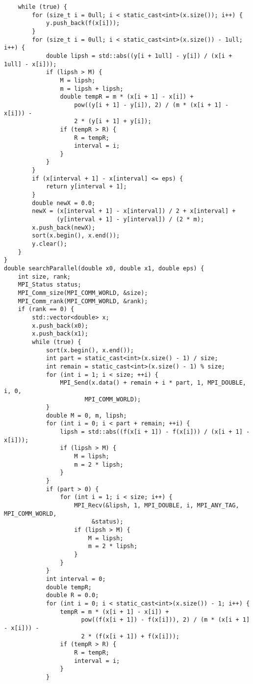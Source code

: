 \documentclass{article}
\begin{document}
\begin{lstlisting}
    while (true) {
        for (size_t i = 0ull; i < static_cast<int>(x.size()); i++) {
            y.push_back(f(x[i]));
        }
        for (size_t i = 0ull; i < static_cast<int>(x.size()) - 1ull; i++) {
            double lipsh = std::abs((y[i + 1ull] - y[i]) / (x[i + 1ull] - x[i]));
            if (lipsh > M) {
                M = lipsh;
                m = lipsh + lipsh;
                double tempR = m * (x[i + 1] - x[i]) +
                    pow((y[i + 1] - y[i]), 2) / (m * (x[i + 1] - x[i])) -
                    2 * (y[i + 1] + y[i]);
                if (tempR > R) {
                    R = tempR;
                    interval = i;
                }
            }
        }
        if (x[interval + 1] - x[interval] <= eps) {
            return y[interval + 1];
        }
        double newX = 0.0;
        newX = (x[interval + 1] - x[interval]) / 2 + x[interval] +
               (y[interval + 1] - y[interval]) / (2 * m);
        x.push_back(newX);
        sort(x.begin(), x.end());
        y.clear();
    }
}
double searchParallel(double x0, double x1, double eps) {
    int size, rank;
    MPI_Status status;
    MPI_Comm_size(MPI_COMM_WORLD, &size);
    MPI_Comm_rank(MPI_COMM_WORLD, &rank);
    if (rank == 0) {
        std::vector<double> x;
        x.push_back(x0);
        x.push_back(x1);
        while (true) {
            sort(x.begin(), x.end());
            int part = static_cast<int>(x.size() - 1) / size;
            int remain = static_cast<int>(x.size() - 1) % size;
            for (int i = 1; i < size; ++i) {
                MPI_Send(x.data() + remain + i * part, 1, MPI_DOUBLE, i, 0,
                       MPI_COMM_WORLD);
            }
            double M = 0, m, lipsh;
            for (int i = 0; i < part + remain; ++i) {
                lipsh = std::abs((f(x[i + 1]) - f(x[i])) / (x[i + 1] - x[i]));
                if (lipsh > M) {
                    M = lipsh;
                    m = 2 * lipsh;
                }
            }
            if (part > 0) {
                for (int i = 1; i < size; i++) {
                    MPI_Recv(&lipsh, 1, MPI_DOUBLE, i, MPI_ANY_TAG, MPI_COMM_WORLD,
                         &status);
                    if (lipsh > M) {
                        M = lipsh;
                        m = 2 * lipsh;
                    }
                }
            }
            int interval = 0;
            double tempR;
            double R = 0.0;
            for (int i = 0; i < static_cast<int>(x.size()) - 1; i++) {
                tempR = m * (x[i + 1] - x[i]) +
                      pow((f(x[i + 1]) - f(x[i])), 2) / (m * (x[i + 1] - x[i])) -
                      2 * (f(x[i + 1]) + f(x[i]));
                if (tempR > R) {
                    R = tempR;
                    interval = i;
                }
            }


\end{lstlisting}
\end{document}
